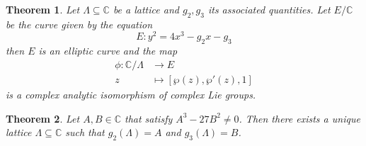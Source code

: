 \documentclass{article}
\newtheorem{theorem}{Theorem}[section]
\theoremstyle{definition}
\theoremstyle{remark}
\newcommand{\C}{\mathbb{C}}
\begin{document}
\begin{theorem}
	Let $\Lambda \subseteq \C$ be a lattice
	and $g_2, g_3$ its associated quantities.
	Let $E/\C$ be the curve given by the equation
	\begin{equation*}
		E: y^2 = 4x^3 - g_2 x - g_3
	\end{equation*}
	then $E$ is an elliptic curve and the map
	\begin{align*}
		\phi: \C/\Lambda &\to E\\
		z &\mapsto [\wp(z), \wp'(z), 1]
	\end{align*}
	is a complex analytic isomorphism of complex Lie groups.
\end{theorem}

\begin{theorem}
	Let $A, B \in \C$ that satisfy $A^3 - 27B^2 \neq 0$.
	Then there exists a unique lattice
	$\Lambda \subseteq \C$ such that
	$g_2(\Lambda) = A$ and $g_3(\Lambda) = B$.
\end{theorem}
\end{document}
